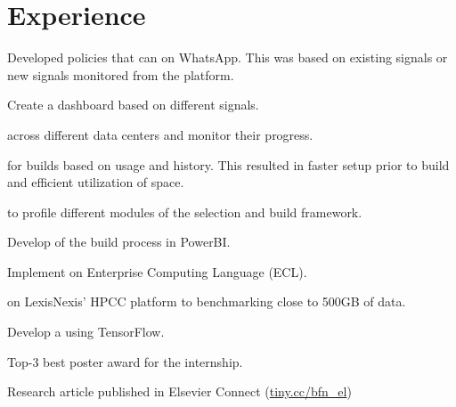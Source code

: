\documentclass[]{bigfatnoob-resume}
\begin{document}
\section{Experience}
\begin{tightemize}
    \item Developed policies that can  on WhatsApp. This was based on existing signals or new signals monitored from the platform.
    \item Create a dashboard  based on different signals.
    \item {} across different data centers and monitor their progress.
\end{tightemize}


\begin{tightemize}
    \item {} for builds based on usage and history. This resulted in faster setup prior to build and efficient utilization of space.
    \item {} to profile different modules of the selection and build framework.
    \item Develop  of the build process in PowerBI.
\end{tightemize}

\begin{tightemize}
	\item Implement  on Enterprise Computing Language (ECL).
	\item {} on LexisNexis' HPCC platform to benchmarking close to 500GB of data.
	\item Develop a  using TensorFlow.
	\item Top-3 best poster award for the internship.
	\item Research article published in Elsevier Connect (\href{https://www.elsevier.com/connect/how-does-your-research-influence-legislation-text-mining-may-reveal-the-answer}{tiny.cc/bfn\_el}) 
\end{tightemize}
\sectionsep
\end{document}
